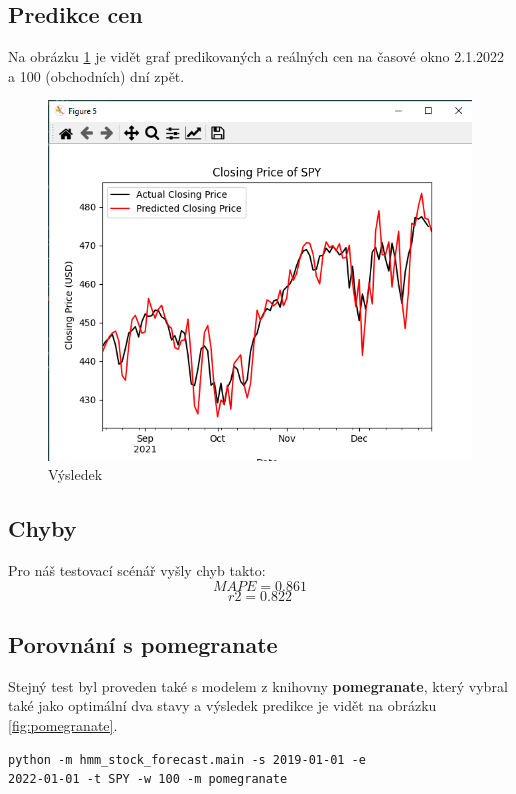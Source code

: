 \subsection{Predikce cen}
Na obrázku \ref{fig:result} je vidět graf predikovaných a reálných cen na časové okno 2.1.2022 a 100 (obchodních) dní zpět.

\begin{figure}[h]
    \includegraphics[width=1\textwidth]{img/result}
    \caption{Výsledek}
    \label{fig:result}
\end{figure}

\subsection{Chyby}
Pro náš testovací scénář vyšly chyb takto:
\[MAPE = 0.861\]
\[r2 = 0.822\]

\subsection{Porovnání s pomegranate}
Stejný test byl proveden také s modelem z knihovny \textbf{pomegranate}, který vybral také jako optimální dva stavy a výsledek predikce je vidět na obrázku \ref{fig:pomegranate}.
\begin{lstlisting}
python -m hmm_stock_forecast.main -s 2019-01-01 -e
2022-01-01 -t SPY -w 100 -m pomegranate
\end{lstlisting}

